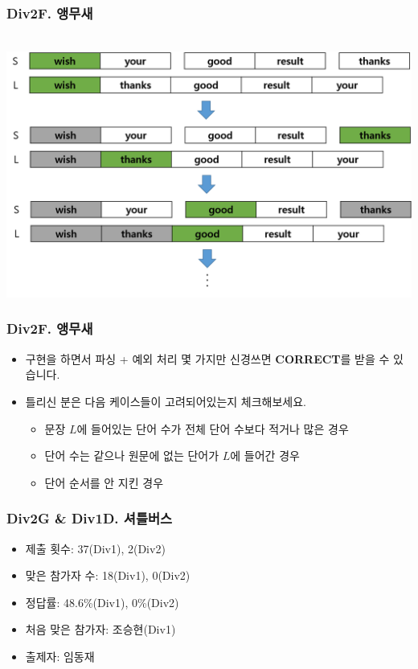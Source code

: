 \documentclass[xetex]{beamer}
\begin{document}
\begin{frame}
  \frametitle{Div2F. 앵무새}
  \begin{center}
    \includegraphics[width=1\textwidth]{parrot-sol.png}
  \end{center}
\end{frame}

\begin{frame}
  \frametitle{Div2F. 앵무새}
  \begin{itemize}
    \item 구현을 하면서 파싱 + 예외 처리 몇 가지만 신경쓰면 \textbf{CORRECT}를 받을 수 있습니다.
    \item 틀리신 분은 다음 케이스들이 고려되어있는지 체크해보세요.
    \begin{itemize}
      \item 문장 $L$에 들어있는 단어 수가 전체 단어 수보다 적거나 많은 경우
      \item 단어 수는 같으나 원문에 없는 단어가 $L$에 들어간 경우
      \item 단어 순서를 안 지킨 경우
    \end{itemize}
  \end{itemize}
\end{frame}

\begin{frame}
  \frametitle{Div2G \& Div1D. 셔틀버스}
  \begin{itemize}
    \item 제출 횟수: 37(Div1), 2(Div2)
    \item 맞은 참가자 수: 18(Div1), 0(Div2)
    \item 정답률: 48.6\%(Div1), 0\%(Div2)
    \item 처음 맞은 참가자: 조승현(Div1)
    \item 출제자: 임동재
  \end{itemize}
\end{frame}
\end{document}
